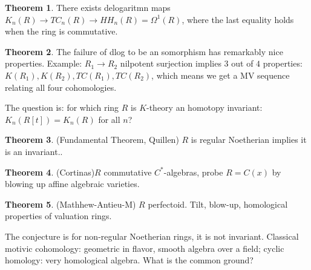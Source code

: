 \documentclass{article}
\theoremstyle{definition}
\newtheorem{theorem}{Theorem}[section]
\theoremstyle{definition}
\theoremstyle{definition}
\theoremstyle{definition}
\theoremstyle{definition}
\theoremstyle{definition}
\theoremstyle{definition}
\begin{document}
\begin{tcolorbox}[colback=red!5!white,colframe=red!30!white]
\begin{theorem}
There exists delogaritmn maps $K_n(R)\to TC_n(R)\to HH_n(R)=\Omega^1(R)$, where the last equality holds when the ring is commutative. 
\end{theorem}
\end{tcolorbox}


\begin{tcolorbox}[colback=red!5!white,colframe=red!30!white]
\begin{theorem}
The failure of dlog to be an somorphism has remarkably nice properties. Example: $R_1\to R_2$ nilpotent surjection implies $3$ out of $4$ properties: $K(R_1),K(R_2), TC(R_1), TC(R_2)$, which means we get a MV sequence relating all four cohomologies. 
\end{theorem}
\end{tcolorbox}
The question is: for which ring $R$ is $K$-theory an homotopy invariant: $K_n(R[t])=K_n(R)$ for all $n$?


\begin{tcolorbox}[colback=red!5!white,colframe=red!30!white]
\begin{theorem}
(Fundamental Theorem, Quillen) $R$ is regular Noetherian implies it is an invariant..

\end{theorem}
\end{tcolorbox}

\begin{tcolorbox}[colback=red!5!white,colframe=red!30!white]
\begin{theorem}
(Cortinas)$R$ commutative $C^*$-algebras, probe $R=C(x)$ by blowing up affine algebraic varieties. 
\end{theorem}
\end{tcolorbox}
 
 \begin{tcolorbox}[colback=red!5!white,colframe=red!30!white]
 \begin{theorem}
 (Mathhew-Antieu-M) $R$ perfectoid. Tilt, blow-up, homological properties of valuation rings.
 \end{theorem}
 \end{tcolorbox}

 The conjecture is for non-regular Noetherian rings, it is not invariant. Classical motivic cohomology: geometric in flavor, smooth algebra over a field; cyclic homology: very homological algebra. What is the common ground?
\end{document}
